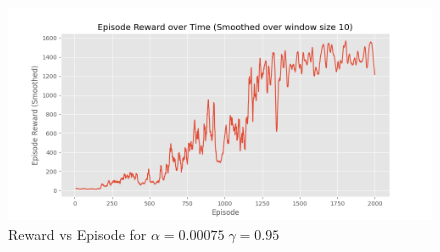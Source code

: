 \documentclass[a4paper]{article}
\theoremstyle{definition}
\newenvironment{soln}{
    \leavevmode\color{blue}\ignorespaces
}{}
\begin{document}
\begin{enumerate}
\begin{soln}
    \begin{figure}[H]
        \centering
        \includegraphics[width=0.8\linewidth]{5_5_b.png}
        \caption{Reward vs Episode for $\alpha = 0.00075 \; \gamma = 0.95$}
        \label{fig:q55}
    \end{figure}

\end{soln}

\end{enumerate}
\end{document}
